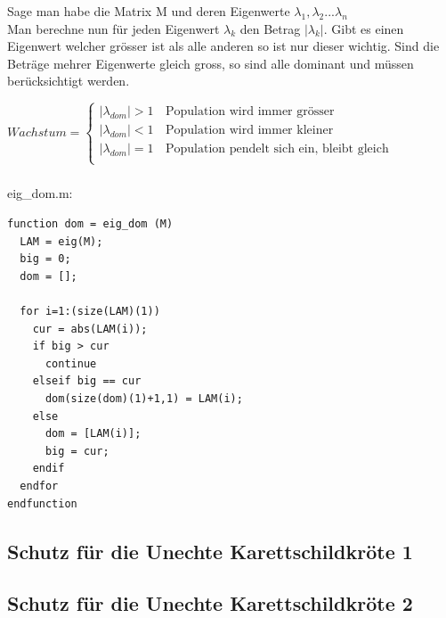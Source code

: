 \documentclass{article}
\begin{document}
\subsubsection{}
Sage man habe die Matrix M und deren Eigenwerte $\lambda_1, \lambda_2 ... \lambda_n$ \\
Man berechne nun für jeden Eigenwert $\lambda_k$ den Betrag $|\lambda_k|$. Gibt es einen Eigenwert welcher grösser ist als alle anderen so ist nur dieser wichtig. Sind die Beträge mehrer Eigenwerte gleich gross, so sind alle dominant und müssen berücksichtigt werden.

\vspace{5mm}

$Wachstum = \left\{
\begin{array}{ll}
|\lambda_{dom}| > 1 & \, \textrm{Population wird immer grösser} \\
|\lambda_{dom}| < 1 & \, \textrm{Population wird immer kleiner} \\
|\lambda_{dom}| = 1 & \, \textrm{Population pendelt sich ein, bleibt gleich} \\
\end{array}
\right. $

\subsubsection{}

eig\_dom.m:
\begin{lstlisting}
function dom = eig_dom (M)
  LAM = eig(M);
  big = 0;
  dom = [];
  
  for i=1:(size(LAM)(1))
    cur = abs(LAM(i));
    if big > cur
      continue
    elseif big == cur
      dom(size(dom)(1)+1,1) = LAM(i);
    else
      dom = [LAM(i)];
      big = cur;
    endif
  endfor
endfunction
\end{lstlisting}

\subsection{Schutz für die Unechte Karettschildkröte 1}

\subsection{Schutz für die Unechte Karettschildkröte 2}
\end{document}
